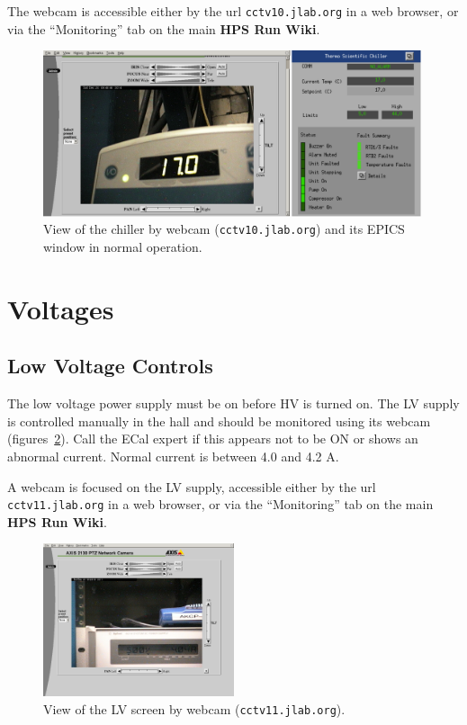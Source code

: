 \documentclass[12pt]{article}
\begin{document}
         The webcam is accessible either by the url \texttt{cctv10.jlab.org} in a web browser, or via the ``Monitoring'' tab on the main {\bf HPS Run Wiki}.

\begin{figure}[h]
\center
\includegraphics[width=0.99\textwidth]{pics/ChillerCombo.png}
\caption{\small \label{ChillerCam} View of the chiller by webcam (\texttt{cctv10.jlab.org}) and its EPICS window in normal operation.}
\end{figure}



   \section{Voltages}

      \subsection{Low Voltage Controls}

      The low voltage power supply must be on before HV is turned on.  The LV supply is controlled manually in the hall and should be monitored using its webcam (figures~\ref{LVCam}). Call the ECal expert if this appears not to be ON or shows an abnormal current.  Normal current is between 4.0 and 4.2 A.

         A webcam is focused on the LV supply, accessible either by the url \texttt{cctv11.jlab.org} in a web browser, or via the ``Monitoring'' tab on the main {\bf HPS Run Wiki}.

\begin{figure}[htbp]
\center
\includegraphics[width=0.5\textwidth]{pics/LVCam_2014_12_20.png}
\caption{\small \label{LVCam} View of the LV screen by webcam (\texttt{cctv11.jlab.org}).}
\end{figure}
\end{document}
